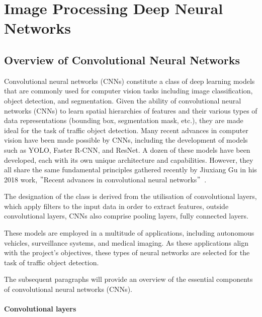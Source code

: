 \section{Image Processing Deep Neural Networks}\label{sec:image-processing-deep-neural-networks}

\subsection{Overview of Convolutional Neural Networks}\label{subsec:convolutional-neural-networks}

Convolutional neural networks (CNNs) constitute a class of deep learning models that are commonly used for computer vision tasks
including image classification, object detection, and segmentation.
Given the ability of convolutional neural networks (CNNs) to learn spatial hierarchies of features and their various types of data representations
(bounding box, segmentation mask, etc.), they are made ideal for the task of traffic object detection.
Many recent advances  in computer vision have been made possible by CNNs, including the development of models such as YOLO, Faster R-CNN, and ResNet.
A dozen of these models have been developed, each with its own unique architecture and capabilities.
However, they all share the same fundamental principles gathered recently by Jiuxiang Gu in his 2018 work,
\("\)Recent advances in convolutional neural networks\("\)~\cite{GU2018354}.

The designation of the class is derived from the utilisation of convolutional layers, which apply filters to the input
data in order to extract features, outside convolutional layers, CNNs also comprise pooling layers, fully
connected layers.

These models are employed in a multitude of applications, including autonomous vehicles, surveillance systems, and medical imaging.
As these applications align with the project's objectives, these types of neural networks are selected for the task of traffic object detection.

The subsequent paragraphs will provide an overview of the essential components of convolutional neural networks (CNNs).

\paragraph{Convolutional layers}\label{par:convolutional-layers}

